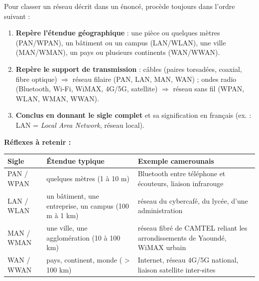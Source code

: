 \documentclass[11pt]{article}
\newcommand{\cle}[1]{{\popxbold\color{popdark}#1}}
\begin{document}
\begin{methode}
Pour classer un réseau décrit dans un énoncé, procède toujours dans l'ordre suivant :
\begin{enumerate}
\item \textbf{Repère l'étendue géographique} : une pièce ou quelques mètres (PAN/WPAN), un bâtiment ou un campus (LAN/WLAN), une ville (MAN/WMAN), un pays ou plusieurs continents (WAN/WWAN).
\item \textbf{Repère le support de transmission} : câbles (paires torsadées, coaxial, fibre optique) $\Rightarrow$ réseau \cle{filaire} (PAN, LAN, MAN, WAN) ; ondes radio (Bluetooth, Wi-Fi, WiMAX, 4G/5G, satellite) $\Rightarrow$ réseau \cle{sans fil} (WPAN, WLAN, WMAN, WWAN).
\item \textbf{Conclus en donnant le sigle complet} et sa signification en français (ex. : LAN = \emph{Local Area Network}, réseau local).
\end{enumerate}
\textbf{Réflexes à retenir :}
\begin{center}
\begin{tabularx}{\linewidth}{|l|X|X|}
\hline
\rowcolor{popblueL} \textbf{Sigle} & \textbf{Étendue typique} & \textbf{Exemple camerounais} \\
\hline
PAN / WPAN & quelques mètres (1 à 10 m) & Bluetooth entre téléphone et écouteurs, liaison infrarouge \\
\hline
LAN / WLAN & un bâtiment, une entreprise, un campus (100 m à 1 km) & réseau du cybercafé, du lycée, d'une administration \\
\hline
MAN / WMAN & une ville, une agglomération (10 à 100 km) & réseau fibré de CAMTEL reliant les arrondissements de Yaoundé, WiMAX urbain \\
\hline
WAN / WWAN & pays, continent, monde ( > 100 km) & Internet, réseau 4G/5G national, liaison satellite inter-sites \\
\hline
\end{tabularx}
\end{center}
\end{methode}
\end{document}
